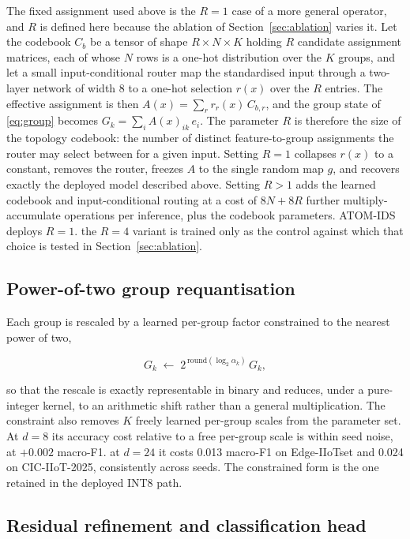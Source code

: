 \documentclass[10pt,letterpaper,twocolumn]{article}
\begin{document}
The fixed assignment used above is the $R = 1$ case of a more general operator,
and $R$ is defined here because the ablation of Section~\ref{sec:ablation}
varies it. Let the codebook $C_b$ be a tensor of shape $R \times N \times K$
holding $R$ candidate assignment matrices, each of whose $N$ rows is a one-hot
distribution over the $K$ groups, and let a small input-conditional router map
the standardised input through a two-layer network of width 8 to a one-hot
selection $r(x)$ over the $R$ entries. The effective assignment is then
$A(x) = \sum_{r} r_{r}(x)\, C_{b,r}$, and the group state of
\eqref{eq:group} becomes $G_{k} = \sum_{i} A(x)_{ik}\, e_{i}$. The parameter
$R$ is therefore the size of the topology codebook: the number of distinct
feature-to-group assignments the router may select between for a given input.
Setting $R = 1$ collapses $r(x)$ to a constant, removes the router, freezes $A$
to the single random map $g$, and recovers exactly the deployed model described
above. Setting $R > 1$ adds the learned codebook and input-conditional routing
at a cost of $8N + 8R$ further multiply-accumulate operations per inference,
plus the codebook parameters. ATOM-IDS deploys $R = 1$. the $R = 4$ variant is
trained only as the control against which that choice is tested in
Section~\ref{sec:ablation}.

\subsection{Power-of-two group requantisation}
\label{sec:method:pow2}

Each group is rescaled by a learned per-group factor constrained to the nearest
power of two,

\begin{equation}
\label{eq:pow2}
G_{k} \;\leftarrow\; 2^{\,\mathrm{round}(\log_{2} \alpha_{k})}\, G_{k},
\end{equation}

so that the rescale is exactly representable in binary and reduces, under a
pure-integer kernel, to an arithmetic shift rather than a general
multiplication. The constraint also removes $K$ freely learned per-group scales
from the parameter set. At $d = 8$ its accuracy cost relative to a free
per-group scale is within seed noise, at $+0.002$ macro-F1. at $d = 24$ it
costs 0.013 macro-F1 on Edge-IIoTset and 0.024 on CIC-IIoT-2025, consistently
across seeds. The constrained form is the one retained in the deployed INT8
path.

\subsection{Residual refinement and classification head}
\label{sec:method:head}
\end{document}
